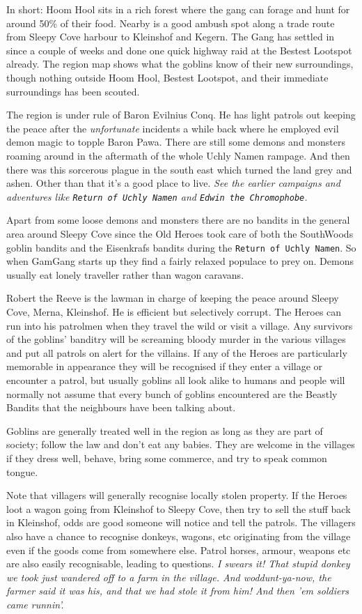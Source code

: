 In short: Hoom Hool sits in a rich forest where the gang can forage and hunt for around 50\% of their food. Nearby is a good ambush spot along a trade route from Sleepy Cove harbour to Kleinshof and Kegern. The Gang has settled in since a couple of weeks and done one quick highway raid at the Bestest Lootspot already. The region map shows what the goblins know of their new surroundings, though nothing outside Hoom Hool, Bestest Lootspot, and their immediate surroundings has been scouted.

The region is under rule of Baron Evilnius Conq. He has light patrols out keeping the peace after the \emph{unfortunate} incidents a while back where he employed evil demon magic to topple Baron Pawa. There are still some demons and monsters roaming around in the aftermath of the whole Uchly Namen rampage. And then there was this sorcerous plague in the south east which turned the land grey and ashen. Other than that it's a good place to live. \textit{See the earlier campaigns and adventures like \texttt{Return of Uchly Namen} and \texttt{Edwin the Chromophobe}.}

Apart from some loose demons and monsters there are no bandits in the general area around Sleepy Cove since the Old Heroes took care of both the SouthWoods goblin bandits and the Eisenkrafs bandits during the \texttt{Return of Uchly Namen}. So when GamGang starts up they find a fairly relaxed populace to prey on. Demons usually eat lonely traveller rather than wagon caravans.

Robert the Reeve is the lawman in charge of keeping the peace around Sleepy Cove, Merna, Kleinshof. He is efficient but selectively corrupt. The Heroes can run into his patrolmen when they travel the wild or visit a village. Any survivors of the goblins' banditry will be screaming bloody murder in the various villages and put all patrols on alert for the villains. If any of the Heroes are particularly memorable in appearance they will be recognised if they enter a village or encounter a patrol, but usually goblins all look alike to humans and people will normally not assume that every bunch of goblins encountered are the Beastly Bandits that the neighbours have been talking about.

Goblins are generally treated well in the region as long as they are part of society; follow the law and don't eat any babies. They are welcome in the villages if they dress well, behave, bring some commerce, and try to speak common tongue.

Note that villagers will generally recognise locally stolen property. If the Heroes loot a wagon going from Kleinshof to Sleepy Cove, then try to sell the stuff back in Kleinshof, odds are good someone will notice and tell the patrols. The villagers also have a chance to recognise donkeys, wagons, etc originating from the village even if the goods come from somewhere else. Patrol horses, armour, weapons etc are also easily recognisable, leading to questions.
\textit{I swears it! That stupid donkey we took just wandered off to a farm in the village. And woddunt-ya-now, the farmer said it was his, and that we had stole it from him! And then 'em soldiers came runnin'.}

